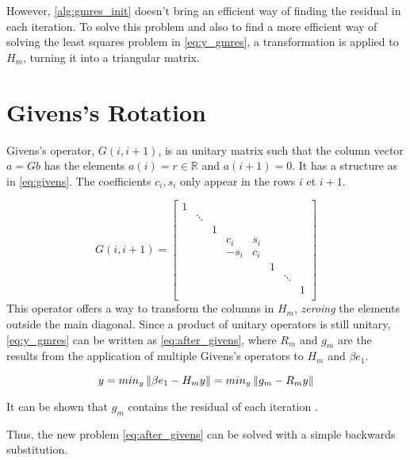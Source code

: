     However, \ref{alg:gmres_init} doesn't bring an efficient way of finding the residual in each iteration. To solve this problem and also to find a more efficient way of solving the least squares problem in \ref{eq:y_gmres}, a transformation is applied to $H_{m}$, turning it into a triangular matrix.

    \section{Givens's Rotation}

    Givens's operator, $G(i,i+1)$, is an unitary matrix such that the column vector $a = Gb$ has the elements $a(i) = r \in \mathbb{R}$ and $a(i+1)=0$. It has a structure as in \ref{eq:givens}. The coefficients $c_{i},s_{i}$ only appear in the rows $i$ et $i+1$.

    \begin{equation}\label{eq:givens}
    G(i,i+1)=
    \begin{bmatrix}
            1 & & & & & & & \\
             &\ddots & & & & & & \\
             & & 1 & & & & & \\
              & & & c_{i}& s_{i} & & & \\
            & & & -s_{i}& c_{i} & & & \\
            & & & & & 1& & \\
            & & & & & & \ddots& \\
            & & & & & & & 1\\
    \end{bmatrix}
    \end{equation}
    This operator offers a way to transform the columns in $H_{m}$, \textit{zeroing} the elements outside the main diagonal. Since a product of unitary operators is still unitary, \ref{eq:y_gmres} can be written as \ref{eq:after_givens}, where $R_{m}$ and $g_{m}$ are the results from the application of multiple Givens's operators to $H_{m}$ and $\beta e_{1}$.

    \begin{equation}\label{eq:after_givens}
        y = min_{y} \left\lVert\beta e_{1} - H_{m}y\right\rVert = min_{y} \left\lVert g_{m} - R_{m}y\right\rVert
    \end{equation}

    It can be shown that $g_{m}$ contains the residual of each iteration \cite{saad2003iterative}.

    Thus, the new problem \ref{eq:after_givens} can be solved with a simple backwards substitution.

